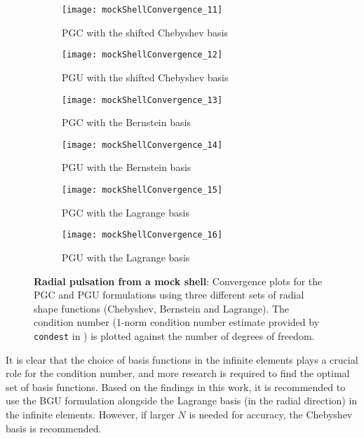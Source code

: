 \begin{figure}
	\begin{subfigure}{0.49\textwidth}
		\centering
		\texttt{[image: mockShellConvergence\_11]}
		\caption{PGC with the shifted Chebyshev basis}
	\end{subfigure}%
	\hspace*{0.02\textwidth}%
	\begin{subfigure}{0.49\textwidth}
		\centering
		\texttt{[image: mockShellConvergence\_12]}
		\caption{PGU with the shifted Chebyshev basis}
	\end{subfigure}
	\par\bigskip
	\begin{subfigure}{0.49\textwidth}
		\centering
		\texttt{[image: mockShellConvergence\_13]}
		\caption{PGC with the Bernstein basis}
	\end{subfigure}%
	\hspace*{0.02\textwidth}%
	\begin{subfigure}{0.49\textwidth}
		\centering
		\texttt{[image: mockShellConvergence\_14]}
		\caption{PGU with the Bernstein basis}
	\end{subfigure}
	\par\bigskip
	\begin{subfigure}{0.49\textwidth}
		\centering
		\texttt{[image: mockShellConvergence\_15]}
		\caption{PGC with the Lagrange basis}
	\end{subfigure}%
	\hspace*{0.02\textwidth}%
	\begin{subfigure}{0.49\textwidth}
		\centering
		\texttt{[image: mockShellConvergence\_16]}
		\caption{PGU with the Lagrange basis}
	\end{subfigure}
	\caption{\textbf{Radial pulsation from a mock shell}: Convergence plots for the PGC and PGU formulations using three different sets of radial shape functions (Chebyshev, Bernstein and Lagrange). The condition number (1-norm condition number estimate provided by \texttt{condest} in \MATLAB) is plotted against the number of degrees of freedom.}
	\label{Fig2:MS_condNumbersP}
\end{figure}

It is clear that the choice of basis functions in the infinite elements plays a crucial role for the condition number, and more research is required to find the optimal set of basis functions. Based on the findings in this work, it is recommended to use the BGU formulation alongside the Lagrange basis (in the radial direction) in the infinite elements. However, if larger $N$ is needed for accuracy, the Chebyshev basis is recommended.

